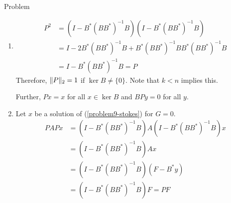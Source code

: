 \begin {blocktheorem}{Problem}
\begin{solution}
\begin{enumerate}
  The first equation implies
  \begin{align*}
   x=A^{-1} (F-B^* y)
  \end{align*}
  and eliminating $x$ in the second equation yields
  \begin{align*}
   BA^{-1} (F-B^* y)=G \Longleftrightarrow BA^{-1} B^* y=BA^{-1} F-G.
   \end{align*}

  \item \begin{align*}P^2&=(I - B^*(BB^*)^{-1}B)(I - B^*(BB^*)^{-1}B)\\
            &=I - 2B^*(BB^*)^{-1}B+ B^*(BB^*)^{-1}BB^*(BB^*)^{-1}B\\
            &= I-B^*(BB^*)^{-1}B=P
        \end{align*}
        Therefore, $\lVert P\rVert_2=1$ if $\operatorname{ker} B\not=\{0\}$.
        Note that $k<n$ implies this.

        Further, $Px=x$ for all $x\in \operatorname{ker} B$ and $BPy=0$ for all $y$.
  \item Let $x$ be a solution of (\ref{problem9-stokes}) for $G=0$.
  \begin{align*}
PAPx &= (I-B^*(BB^*)^{-1}B) A (I-B^*(BB^*)^{-1}B) x\\
&= (I-B^*(BB^*)^{-1}B) Ax\\
&= (I-B^*(BB^*)^{-1}B) (F-B^* y)\\
&= (I-B^*(BB^*)^{-1}B) F = PF
        \end{align*}

\end{enumerate}
\end{solution}
\end{blocktheorem}

\clearpage

